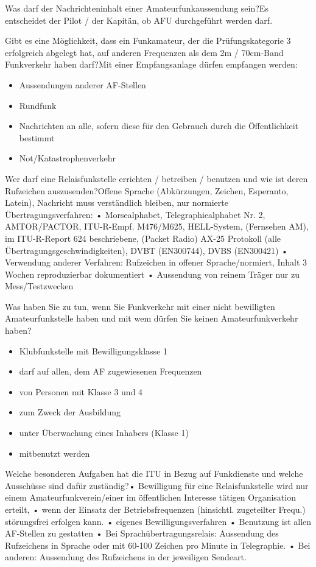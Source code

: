 \documentclass[avery5371,grid,frame,a4paper]{flashcards}
\newcommand{\card}[3]{
  \begin{flashcard}[{\chap} -- #1]{#2}#3\end{flashcard}
}
\begin{document}
\card{51}{Was darf der Nachrichteninhalt einer Amateurfunkaussendung sein?}{Es entscheidet der Pilot / der Kapitän, ob AFU durchgeführt werden darf.}

\card{52}{Gibt es eine Möglichkeit, dass ein Funkamateur, der die Prüfungskategorie 3 erfolgreich abgelegt hat, auf anderen Frequenzen als dem 2m / 70cm-Band Funkverkehr haben darf?}{Mit einer Empfangsanlage dürfen empfangen werden: \begin{itemize}\itemsep1pt \item Aussendungen anderer AF-Stellen \item Rundfunk \item Nachrichten an alle, sofern diese für den
Gebrauch durch die Öffentlichkeit bestimmt \item Not/Katastrophenverkehr\end{itemize}}

\card{53}{Wer darf eine Relaisfunkstelle errichten / betreiben / benutzen und wie ist deren Rufzeichen auszusenden?}{\small{Offene Sprache (Abkürzungen, Zeichen, Esperanto, Latein), Nachricht muss verständlich bleiben, nur normierte Übertragungsverfahren:
•  Morsealphabet, Telegraphiealphabet Nr. 2, AMTOR/PACTOR, ITU-R-Empf. M476/M625, HELL-System, (Fernsehen AM), im ITU-R-Report 624 beschriebene, (Packet Radio) AX-25
Protokoll (alle Übertragungsgeschwindigkeiten), DVBT (EN300744), DVBS (EN300421)
•  Verwendung anderer Verfahren: Rufzeichen in offener Sprache/normiert, Inhalt 3 Wochen reproduzierbar dokumentiert
•  Aussendung von reinem Träger nur zu Mess/Testzwecken}}

\card{54}{Was haben Sie zu tun, wenn Sie Funkverkehr mit einer nicht bewilligten Amateurfunkstelle haben und mit wem dürfen Sie keinen Amateurfunkverkehr haben?}{\begin{itemize}\itemsep1pt \item Klubfunkstelle mit Bewilligungsklasse 1 \item darf auf allen, dem AF zugewiesenen Frequenzen \item von Personen mit Klasse 3 und 4 \item zum Zweck der Ausbildung \item unter Überwachung eines Inhabers (Klasse 1) \item mitbenutzt werden\end{itemize}}

\card{55}{Welche besonderen Aufgaben hat die ITU in Bezug auf Funkdienste und welche Ausschüsse sind dafür zuständig?}{• Bewilligung für eine Relaisfunkstelle wird nur einem
Amateurfunkverein/einer im öffentlichen Interesse tätigen Organisation erteilt,
• wenn der Einsatz der Betriebsfrequenzen (hinsichtl. zugeteilter Frequ.) störungsfrei erfolgen kann.
• eigenes Bewilligungsverfahren
• Benutzung ist allen AF-Stellen zu gestatten
• Bei Sprachübertragungsrelais: Aussendung des Rufzeichens in Sprache oder mit 60-100 Zeichen pro Minute in Telegraphie.
• Bei anderen: Aussendung des Rufzeichens in der jeweiligen Sendeart.}
\end{document}
